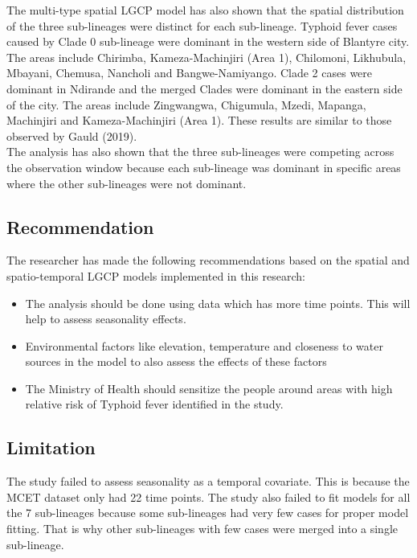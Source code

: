 \documentclass[a4paper]{thesis}
\begin{document}
The multi-type spatial LGCP model has also shown that the spatial distribution of the three sub-lineages were distinct for each sub-lineage. Typhoid fever cases caused by Clade 0 sub-lineage were dominant in the western side of Blantyre city. The areas include Chirimba, Kameza-Machinjiri (Area 1), Chilomoni, Likhubula, Mbayani, Chemusa, Nancholi and Bangwe-Namiyango. Clade 2 cases were dominant in Ndirande and the merged Clades were dominant in the eastern side of the city. The areas include Zingwangwa, Chigumula, Mzedi, Mapanga, Machinjiri and Kameza-Machinjiri (Area 1). These results are similar to those observed by Gauld (2019)\cite{Gauld2019a}.\\

The analysis has also shown that the three sub-lineages were competing across the observation window because each sub-lineage was dominant in specific areas where the other sub-lineages were not dominant.

\subsection{Recommendation}

The researcher has made the following recommendations based on the spatial and spatio-temporal LGCP models implemented in this research:

\begin{itemize}
\item The analysis should be done using data which has more time points. This will help to assess seasonality effects.
\item Environmental factors like elevation, temperature and closeness to water sources in the model to also assess the effects of these factors 
\item The Ministry of Health should sensitize the people around areas with high relative risk of Typhoid fever identified in the study.
\end{itemize}

\subsection{Limitation}

The study failed to assess seasonality as a temporal covariate. This is because the MCET dataset only had 22 time points. The study also failed to fit models for all the 7 sub-lineages because some sub-lineages had very few cases for proper model fitting. That is why other sub-lineages with few cases were merged into a single sub-lineage.
\end{document}
